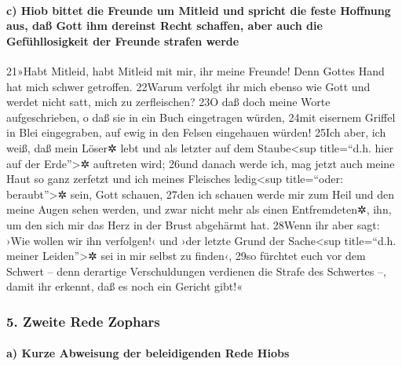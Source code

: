 \hypertarget{c-hiob-bittet-die-freunde-um-mitleid-und-spricht-die-feste-hoffnung-aus-dauxdf-gott-ihm-dereinst-recht-schaffen-aber-auch-die-gefuxfchllosigkeit-der-freunde-strafen-werde}{%
\paragraph{c) Hiob bittet die Freunde um Mitleid und spricht die feste
Hoffnung aus, daß Gott ihm dereinst Recht schaffen, aber auch die
Gefühllosigkeit der Freunde strafen
werde}\label{c-hiob-bittet-die-freunde-um-mitleid-und-spricht-die-feste-hoffnung-aus-dauxdf-gott-ihm-dereinst-recht-schaffen-aber-auch-die-gefuxfchllosigkeit-der-freunde-strafen-werde}}

21»Habt Mitleid, habt Mitleid mit mir, ihr meine Freunde! Denn Gottes
Hand hat mich schwer getroffen. 22Warum verfolgt ihr mich ebenso wie
Gott und werdet nicht satt, mich zu zerfleischen? 23O daß doch meine
Worte aufgeschrieben, o daß sie in ein Buch eingetragen würden, 24mit
eisernem Griffel in Blei eingegraben, auf ewig in den Felsen eingehauen
würden! 25Ich aber, ich weiß, daß mein Löser✲ lebt und als letzter auf
dem Staube\textless sup title=``d.h. hier auf der Erde''\textgreater✲
auftreten wird; 26und danach werde ich, mag jetzt auch meine Haut so
ganz zerfetzt und ich meines Fleisches ledig\textless sup title=``oder:
beraubt''\textgreater✲ sein, Gott schauen, 27den ich schauen werde mir
zum Heil und den meine Augen sehen werden, und zwar nicht mehr als einen
Entfremdeten✲, ihn, um den sich mir das Herz in der Brust abgehärmt hat.
28Wenn ihr aber sagt: ›Wie wollen wir ihn verfolgen!‹ und ›der letzte
Grund der Sache\textless sup title=``d.h. meiner Leiden''\textgreater✲
sei in mir selbst zu finden‹, 29so fürchtet euch vor dem Schwert -- denn
derartige Verschuldungen verdienen die Strafe des Schwertes --, damit
ihr erkennt, daß es noch ein Gericht gibt!«

\hypertarget{zweite-rede-zophars}{%
\subsubsection{5. Zweite Rede Zophars}\label{zweite-rede-zophars}}

\hypertarget{a-kurze-abweisung-der-beleidigenden-rede-hiobs}{%
\paragraph{a) Kurze Abweisung der beleidigenden Rede
Hiobs}\label{a-kurze-abweisung-der-beleidigenden-rede-hiobs}}

